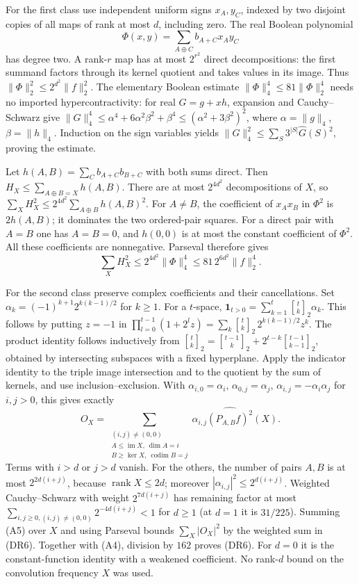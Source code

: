 For the first class use independent uniform signs $x_A,y_C$, indexed by
two disjoint copies of all maps of rank at most $d$, including zero.
The real Boolean polynomial
\[
 \Phi(x,y)=\sum_{A\oplus C} b_{A+C}x_Ay_C
\]
has degree two. A rank-$r$ map has at most $2^{r^2}$ direct
decompositions: the first summand factors through its kernel quotient
and takes values in its image. Thus
$\|\Phi\|_2^2\le2^{d^2}\|f\|_2^2$.
The elementary Boolean estimate $\|\Phi\|_4^4\le81\|\Phi\|_2^4$
needs no imported hypercontractivity: for real $G=g+xh$, expansion and
Cauchy--Schwarz give
$\|G\|_4^4\le\alpha^4+6\alpha^2\beta^2+\beta^4
\le(\alpha^2+3\beta^2)^2$, where
$\alpha=\|g\|_4$, $\beta=\|h\|_4$.
Induction on the sign variables yields
$\|G\|_4^2\le\sum_S3^{|S|}\widehat G(S)^2$, proving the estimate.

Let $h(A,B)=\sum_C b_{A+C}b_{B+C}$ with both sums direct.
Then $H_X\le\sum_{A\oplus B=X}h(A,B)$. There are at most
$2^{4d^2}$ decompositions of $X$, so
$\sum_XH_X^2\le2^{4d^2}\sum_{A\oplus B}h(A,B)^2$.
For $A\ne B$, the coefficient of $x_Ax_B$ in $\Phi^2$ is
$2h(A,B)$; it dominates the two ordered-pair squares. For a direct pair
with $A=B$ one has $A=B=0$, and $h(0,0)$ is at most the constant
coefficient of $\Phi^2$. All these coefficients are nonnegative.
Parseval therefore gives
\[
 \sum_XH_X^2\le2^{4d^2}\|\Phi\|_4^4
                    \le81\,2^{6d^2}\|f\|_2^4.       \tag{A4}
\]

For the second class preserve complex coefficients and their
cancellations. Set $\alpha_k=(-1)^{k+1}2^{k(k-1)/2}$ for $k\ge1$.
For a $t$-space,
$\mathbf1_{t>0}=\sum_{k=1}^t{t\brack k}_2\alpha_k$.
This follows by putting $z=-1$ in
$\prod_{l=0}^{t-1}(1+2^lz)
=\sum_k{t\brack k}_2\,2^{k(k-1)/2}z^k$.
The product identity follows inductively from
${t\brack k}_2={t-1\brack k}_2+2^{t-k}{t-1\brack k-1}_2$,
obtained by intersecting subspaces with a fixed hyperplane.
Apply the indicator identity to the triple image intersection and to
the quotient by the sum of kernels, and use inclusion--exclusion.
With $\alpha_{i,0}=\alpha_i$, $\alpha_{0,j}=\alpha_j$,
$\alpha_{i,j}=-\alpha_i\alpha_j$ for $i,j>0$, this gives exactly
\[
 O_X=\sum_{\substack{(i,j)\ne(0,0)\\
 A\le\operatorname{im}X,\ \dim A=i\\
 B\ge\ker X,\ \operatorname{codim}B=j}}
       \alpha_{i,j}\widehat{(P_{A,B}f)^2}(X).         \tag{A5}
\]
Terms with $i>d$ or $j>d$ vanish. For the others, the number of pairs
$A,B$ is at most $2^{2d(i+j)}$, because $\operatorname{rank}X\le2d$;
moreover $|\alpha_{i,j}|^2\le2^{d(i+j)}$.
Weighted Cauchy--Schwarz with weight $2^{7d(i+j)}$ has remaining factor
at most
$\sum_{i,j\ge0,(i,j)\ne(0,0)}2^{-4d(i+j)}<1$ for $d\ge1$
(at $d=1$ it is $31/225$).
Summing (A5) over $X$ and using Parseval bounds
$\sum_X|O_X|^2$ by the weighted sum in (DR6).
Together with (A4), division by $162$ proves (DR6).
For $d=0$ it is the constant-function identity with a weakened
coefficient. No rank-$d$ bound on the convolution frequency $X$ was used.

